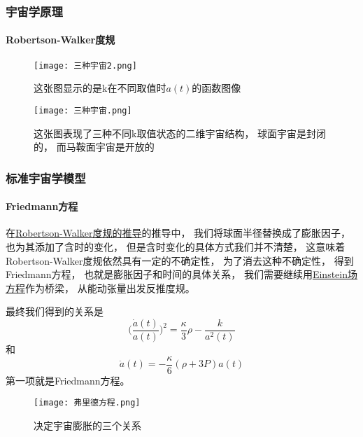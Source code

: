 \documentclass[8pt]{beamer}
\begin{document}
        \begin{frame}[fragile]
            \frametitle{宇宙学原理}
            \framesubtitle{Robertson-Walker度规}
            \begin{multicols}{2}
                \begin{figure}[h]
                    \centering
                    \texttt{[image: 三种宇宙2.png]}  
                    \caption{这张图显示的是k在不同取值时$a(t)$的函数图像}
                \end{figure}
                \begin{figure}[h]
                    \centering
                    \texttt{[image: 三种宇宙.png]}  
                    \caption{这张图表现了三种不同k取值状态的二维宇宙结构，
                    球面宇宙是封闭的，
                    而马鞍面宇宙是开放的}
                \end{figure}
            \end{multicols}
            
        \end{frame}


        \begin{frame}[fragile]
            \frametitle{标准宇宙学模型}
            \framesubtitle{Friedmann方程}
            \begin{multicols}{2} 
                \qquad
                在\hyperlink{附录2}{\underline{Robertson-Walker度规的推导}}的推导中，
                我们将球面半径替换成了膨胀因子，
                也为其添加了含时的变化，
                但是含时变化的具体方式我们并不清楚，
                这意味着Robertson-Walker度规依然具有一定的不确定性，
                为了消去这种不确定性，
                得到Friedmann方程，
                也就是膨胀因子和时间的具体关系，
                我们需要继续用\hyperlink{附录3}{\underline{Einstein场方程}}作为桥梁，
                从能动张量出发反推度规。

                \qquad
                最终我们得到的关系是
                $$\biggl(\frac{\dot{a}(t)}{a(t)}\biggr)^2=\frac{\kappa }{3}\rho -\frac{k}{a^2(t)}$$
                和
                $$\ddot{a}(t)=-\frac{\kappa}{6}(\rho+3P)a(t)$$
                第一项就是Friedmann方程。

                \begin{figure}[h]
                    \centering
                    \texttt{[image: 弗里德方程.png]}  
                    \caption{决定宇宙膨胀的三个关系}
                \end{figure}

            \end{multicols}
        \end{frame}
\end{document}
